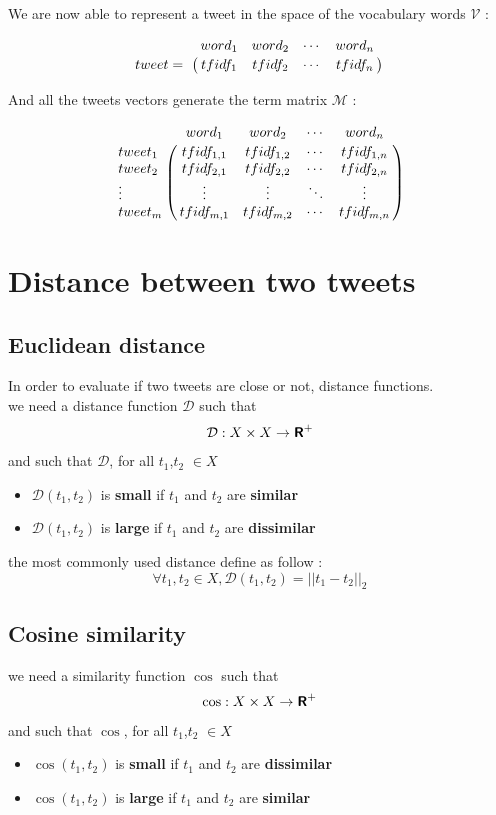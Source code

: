 \documentclass[a4paper,twoside,12pt,openright]{report}
\begin{document}
We are now able to represent a tweet in the space of the vocabulary words $\mathcal{V}$ :

\[
\bordermatrix{~ & word_1 & word_2 & \cdots & word_n \cr tweet =  & tfidf_1 & tfidf_2 & \cdots & tfidf_n \cr}
\]

And all the tweets vectors generate the term matrix $\mathcal{M}$ :

\[
\bordermatrix{
~ & word_1 & word_2 & \cdots & word_n \cr 
tweet_1 & tfidf_{1,1} & tfidf_{1,2} & \cdots & tfidf_{1,n} \cr
tweet_2 & tfidf_{2,1} & tfidf_{2,2} & \cdots & tfidf_{2,n} \cr
\vdots & \vdots & \vdots & \ddots & \vdots \cr
tweet_m & tfidf_{m,1} & tfidf_{m,2} & \cdots & tfidf_{m,n} \cr
}
\]

\newpage

\section{Distance between two tweets}

\subsection{Euclidean distance}
In order to evaluate if two tweets are close or not, distance functions.\\
we need a distance function $\mathcal{D}$ such that
$$ \mathcal{D} : X\times X \rightarrow \textbf{\textsf{R}}^+ $$
and such that $\mathcal{D}$, for all $t_1$,$t_2$ $\in X$
\begin{itemize}
\item $\mathcal{D}(t_1,t_2)$ is \textbf{small} if $t_1$ and $t_2$ are \textbf{similar}
\item $\mathcal{D}(t_1,t_2)$ is \textbf{large} if $t_1$ and $t_2$ are \textbf{dissimilar}
\end{itemize}
the most commonly used distance define as follow :
$$ \forall t_1,t_2 \in X, \mathcal{D}(t_1,t_2) = || t_1 - t_2 ||_2 $$


\subsection{Cosine similarity}

we need a similarity function $\cos$ such that
$$ \cos : X\times X \rightarrow \textbf{\textsf{R}}^+ $$
and such that $\cos$, for all $t_1$,$t_2$ $\in X$
\begin{itemize}
\item $\cos(t_1,t_2)$ is \textbf{small} if $t_1$ and $t_2$ are \textbf{dissimilar}
\item $\cos(t_1,t_2)$ is \textbf{large} if $t_1$ and $t_2$ are \textbf{similar}
\end{itemize}
\end{document}
